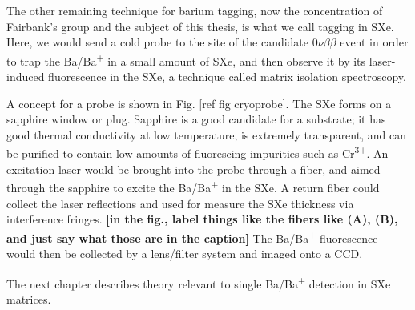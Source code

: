 The other remaining technique for barium tagging, now the concentration of Fairbank's group and the subject of this thesis, is what we call tagging in SXe.  Here, we would send a cold probe to the site of the candidate $0\nu\beta\beta$ event in order to trap the Ba/Ba\textsuperscript{+} in a small amount of SXe, and then observe it by its laser-induced fluorescence in the SXe, a technique called matrix isolation spectroscopy.

A concept for a probe is shown in Fig. [ref fig cryoprobe].  The SXe forms on a sapphire window or plug.  Sapphire is a good candidate for a substrate; it has good thermal conductivity at low temperature, is extremely transparent, and can be purified to contain low amounts of fluorescing impurities such as Cr\textsuperscript{3+}.  An excitation laser would be brought into the probe through a fiber, and aimed through the sapphire to excite the Ba/Ba\textsuperscript{+} in the SXe.  A return fiber could collect the laser reflections and used for measure the SXe thickness via interference fringes.  {\color{red}\textbf{[in the fig., label things like the fibers like (A), (B), and just say what those are in the caption]}}  The Ba/Ba\textsuperscript{+} fluorescence would then be collected by a lens/filter system and imaged onto a CCD.

The next chapter describes theory relevant to single Ba/Ba\textsuperscript{+} detection in SXe matrices.